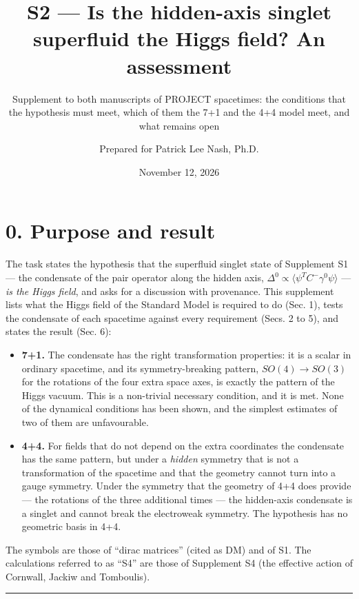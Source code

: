 \documentclass[
  10pt,
]{article}
\title{S2 --- Is the hidden-axis singlet superfluid the Higgs field? An
assessment}
\subtitle{Supplement to both manuscripts of PROJECT spacetimes: the
conditions that the hypothesis must meet, which of them the 7+1 and the
4+4 model meet, and what remains open}
\author{Prepared for Patrick Lee Nash, Ph.D.}
\date{November 12, 2026}
\providecommand{\tightlist}{%
  \setlength{\itemsep}{0pt}\setlength{\parskip}{0pt}}
\begin{document}
\maketitle

\hypertarget{purpose-and-result}{%
\section{0. Purpose and result}\label{purpose-and-result}}

The task states the hypothesis that the superfluid singlet state of
Supplement S1 --- the condensate of the pair operator along the hidden
axis, \(\Delta^0\propto\langle\psi^TC^{-}\gamma^0\psi\rangle\) ---
\emph{is the Higgs field}, and asks for a discussion with provenance.
This supplement lists what the Higgs field of the Standard Model is
required to do (Sec. 1), tests the condensate of each spacetime against
every requirement (Secs. 2 to 5), and states the result (Sec. 6):

\begin{itemize}
\tightlist
\item
  \textbf{7+1.} The condensate has the right transformation properties:
  it is a scalar in ordinary spacetime, and its symmetry-breaking
  pattern, \(SO(4)\to SO(3)\) for the rotations of the four extra space
  axes, is exactly the pattern of the Higgs vacuum. This is a
  non-trivial necessary condition, and it is met. None of the dynamical
  conditions has been shown, and the simplest estimates of two of them
  are unfavourable.
\item
  \textbf{4+4.} For fields that do not depend on the extra coordinates
  the condensate has the same pattern, but under a \emph{hidden}
  symmetry that is not a transformation of the spacetime and that the
  geometry cannot turn into a gauge symmetry. Under the symmetry that
  the geometry of 4+4 does provide --- the rotations of the three
  additional times --- the hidden-axis condensate is a singlet and
  cannot break the electroweak symmetry. The hypothesis has no geometric
  basis in 4+4.
\end{itemize}

The symbols are those of ``dirac matrices'' (cited as DM) and of S1. The
calculations referred to as ``S4'' are those of Supplement S4 (the
effective action of Cornwall, Jackiw and Tomboulis).

\begin{center}\rule{0.5\linewidth}{0.5pt}\end{center}
\end{document}
